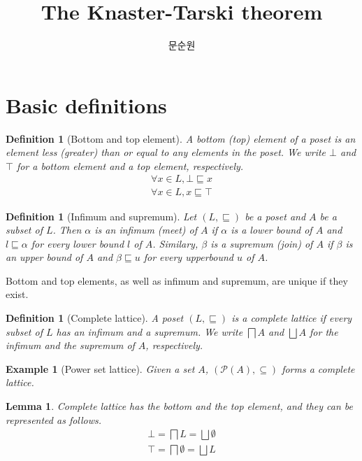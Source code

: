 \documentclass{article}
\title{The Knaster-Tarski theorem}
\author{문순원}
\newtheorem{lemma}[theorem]{Lemma}
\newtheorem{definition}[theorem]{Definition}
\newtheorem{example}[theorem]{Example}
\newcommand\pow[1]{\mathcal{P}(#1)}
\begin{document}
\maketitle

\section{Basic definitions}
  \begin{definition}[Bottom and top element]
    A bottom (top) element of a poset is an element less (greater) than or equal to any elements in the poset.
    We write $\bot$ and $\top$ for a bottom element and a top element, respectively.
    $$
      \begin{aligned}
        \forall x \in L, \bot \sqsubseteq x \\
        \forall x \in L, x \sqsubseteq \top
      \end{aligned}
    $$
  \end{definition}

  \begin{definition}[Infimum and supremum]
    Let $(L,\sqsubseteq)$ be a poset and $A$ be a subset of $L$.
    Then $\alpha$ is an infimum (meet) of $A$ if $\alpha$ is a lower bound of $A$
    and $l \sqsubseteq \alpha$ for every lower bound $l$ of $A$.
    Similary, $\beta$ is a supremum (join) of $A$ if $\beta$ is an upper bound of $A$
    and $\beta \sqsubseteq u$ for every upperbound $u$ of $A$.
  \end{definition}

  Bottom and top elements, as well as infimum and supremum, are unique if they exist.

  \begin{definition}[Complete lattice]
    A poset $(L, \sqsubseteq)$ is a complete lattice if
    every subset of $L$ has an infimum and a supremum.
    We write $\bigsqcap A$ and $\bigsqcup A$ for the infimum and the supremum of $A$, respectively.
  \end{definition}

  \begin{example}[Power set lattice]
    Given a set $A$, $(\pow{A}, \subseteq)$ forms a complete lattice.
  \end{example}

  \begin{lemma}
    Complete lattice has the bottom and the top element, and they can be represented as follows.
    $$
      \begin{aligned}
        \bot = \bigsqcap L         = \bigsqcup \emptyset \\
        \top = \bigsqcap \emptyset = \bigsqcup L
      \end{aligned}
    $$
  \end{lemma}
\end{document}
